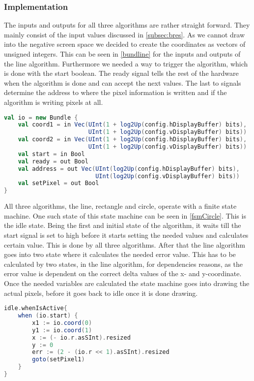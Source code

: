 \subsubsection*{Implementation}
The inputs and outputs for all three algorithms are rather straight forward. They mainly consist of the input values discussed in \cref{subsec:bres}. As we cannot draw into the negative screen space we decided to create the coordinates as vectors of unsigned integers. This can be seen in \cref{bundline} for the inputs and outputs of the line algorithm. Furthermore we needed a way to trigger the algorithm, which is done with the start boolean. The ready signal tells the rest of the hardware when the algorithm is done and can accept the next values. The last to signals determine the address to where the pixel information is written and if the algorithm is writing pixels at all.
\begin{lstlisting}[language=scala, caption={Line IOs}, label=bundline]
val io = new Bundle {
	val coord1 = in Vec(UInt(1 + log2Up(config.hDisplayBuffer) bits), 
			    		UInt(1 + log2Up(config.vDisplayBuffer) bits))
	val coord2 = in Vec(UInt(1 + log2Up(config.hDisplayBuffer) bits), 
			    		UInt(1 + log2Up(config.vDisplayBuffer) bits))
	val start = in Bool
	val ready = out Bool
	val address = out Vec(UInt(log2Up(config.hDisplayBuffer) bits), 
			      		  UInt(log2Up(config.vDisplayBuffer) bits))
	val setPixel = out Bool
}
\end{lstlisting}
All three algorithms, the line, rectangle and circle, operate with a finite state machine. One such state of this state machine can be seen in \cref{fsmCircle}. This is the idle state. Being the first and initial state of the algorithm, it waits till the start signal is set to high before it starts setting the needed values and calculates certain value. This is done by all three algorithms. After that the line algorithm goes into two state where it calculates the needed error value. This has to be calculated by two states, in the line algorithm, for dependencies reasons, as the error value is dependent on the correct delta values of the x- and y-coordinate. Once the needed variables are calculated the state machine goes into drawing the actual pixels, before it goes back to idle once it is done drawing.
\begin{lstlisting}[language=scala, caption={Start of the Circle Algorithm}, label=fsmCircle]
idle.whenIsActive{
	when (io.start) {
		x1 := io.coord(0)
		y1 := io.coord(1)
		x := (- io.r.asSInt).resized
		y := 0
		err := (2 - (io.r << 1).asSInt).resized
		goto(setPixel1)
	}
}
\end{lstlisting}
